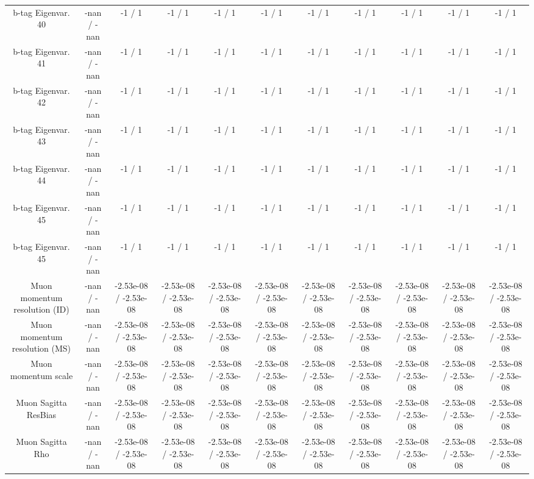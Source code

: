 \begin{table}[htbp]
\begin{center}
\begin{tabular}{|c|c|c|c|c|c|c|c|c|c|c|}
  b-tag Eigenvar. 40 & -nan / -nan & -1 / 1 & -1 / 1 & -1 / 1 & -1 / 1 & -1 / 1 & -1 / 1 & -1 / 1 & -1 / 1 & -1 / 1 \\ 
  b-tag Eigenvar. 41 & -nan / -nan & -1 / 1 & -1 / 1 & -1 / 1 & -1 / 1 & -1 / 1 & -1 / 1 & -1 / 1 & -1 / 1 & -1 / 1 \\ 
  b-tag Eigenvar. 42 & -nan / -nan & -1 / 1 & -1 / 1 & -1 / 1 & -1 / 1 & -1 / 1 & -1 / 1 & -1 / 1 & -1 / 1 & -1 / 1 \\ 
  b-tag Eigenvar. 43 & -nan / -nan & -1 / 1 & -1 / 1 & -1 / 1 & -1 / 1 & -1 / 1 & -1 / 1 & -1 / 1 & -1 / 1 & -1 / 1 \\ 
  b-tag Eigenvar. 44 & -nan / -nan & -1 / 1 & -1 / 1 & -1 / 1 & -1 / 1 & -1 / 1 & -1 / 1 & -1 / 1 & -1 / 1 & -1 / 1 \\ 
  b-tag Eigenvar. 45 & -nan / -nan & -1 / 1 & -1 / 1 & -1 / 1 & -1 / 1 & -1 / 1 & -1 / 1 & -1 / 1 & -1 / 1 & -1 / 1 \\ 
  b-tag Eigenvar. 45 & -nan / -nan & -1 / 1 & -1 / 1 & -1 / 1 & -1 / 1 & -1 / 1 & -1 / 1 & -1 / 1 & -1 / 1 & -1 / 1 \\ 
  Muon momentum resolution (ID) & -nan / -nan & -2.53e-08 / -2.53e-08 & -2.53e-08 / -2.53e-08 & -2.53e-08 / -2.53e-08 & -2.53e-08 / -2.53e-08 & -2.53e-08 / -2.53e-08 & -2.53e-08 / -2.53e-08 & -2.53e-08 / -2.53e-08 & -2.53e-08 / -2.53e-08 & -2.53e-08 / -2.53e-08 \\ 
  Muon momentum resolution (MS) & -nan / -nan & -2.53e-08 / -2.53e-08 & -2.53e-08 / -2.53e-08 & -2.53e-08 / -2.53e-08 & -2.53e-08 / -2.53e-08 & -2.53e-08 / -2.53e-08 & -2.53e-08 / -2.53e-08 & -2.53e-08 / -2.53e-08 & -2.53e-08 / -2.53e-08 & -2.53e-08 / -2.53e-08 \\ 
  Muon momentum scale & -nan / -nan & -2.53e-08 / -2.53e-08 & -2.53e-08 / -2.53e-08 & -2.53e-08 / -2.53e-08 & -2.53e-08 / -2.53e-08 & -2.53e-08 / -2.53e-08 & -2.53e-08 / -2.53e-08 & -2.53e-08 / -2.53e-08 & -2.53e-08 / -2.53e-08 & -2.53e-08 / -2.53e-08 \\ 
  Muon Sagitta ResBias & -nan / -nan & -2.53e-08 / -2.53e-08 & -2.53e-08 / -2.53e-08 & -2.53e-08 / -2.53e-08 & -2.53e-08 / -2.53e-08 & -2.53e-08 / -2.53e-08 & -2.53e-08 / -2.53e-08 & -2.53e-08 / -2.53e-08 & -2.53e-08 / -2.53e-08 & -2.53e-08 / -2.53e-08 \\ 
  Muon Sagitta Rho & -nan / -nan & -2.53e-08 / -2.53e-08 & -2.53e-08 / -2.53e-08 & -2.53e-08 / -2.53e-08 & -2.53e-08 / -2.53e-08 & -2.53e-08 / -2.53e-08 & -2.53e-08 / -2.53e-08 & -2.53e-08 / -2.53e-08 & -2.53e-08 / -2.53e-08 & -2.53e-08 / -2.53e-08 \\ 

\end{tabular}
\end{center}
\end{table}
